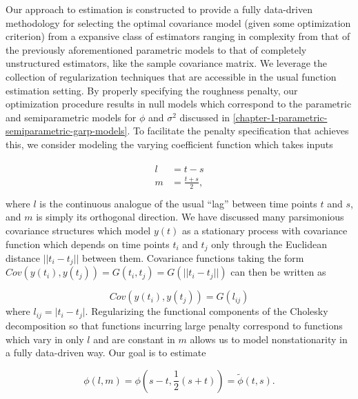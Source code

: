 \documentclass[12pt]{article}
\theoremstyle{definition}
\begin{document}
Our approach to estimation is constructed to provide a fully data-driven methodology for selecting the optimal covariance model (given some optimization criterion) from a expansive class of estimators ranging in complexity from that of the previously aforementioned parametric models to that of completely unstructured estimators, like the sample covariance matrix. We leverage the collection of regularization techniques that are accessible in the usual function estimation setting. By properly specifying the roughness penalty, our optimization procedure results in null models which correspond to the parametric and semiparametric models for $\phi$ and $\sigma^2$ discussed in \ref{chapter-1-parametric-semiparametric-garp-models}. To facilitate the penalty specification that achieves this, we consider modeling the varying coefficient function which takes inputs

\begin{align} 
\begin{split}\label{eq:l-m-transformation}
l &= t - s \\
m &= \frac{t + s}{2}, \\
\end{split}
\end{align}
\noindent
 where $l$ is the continuous analogue of the usual ``lag'' between time points $t$ and $s$, and $m$ is simply its orthogonal direction. We have discussed many parsimonious covariance structures which model $y\left(t\right)$ as a stationary process with covariance function which depends on time points $t_i$ and $t_j$ only through the Euclidean distance $\vert \vert t_i - t_j \vert \vert$ between them. Covariance functions taking the form $Cov\left(y\left( t_i \right),y\left( t_j \right)\right) =G\left(t_i,t_j\right) = G\left(\vert \vert t_i - t_j \vert \vert \right)$ can then be written as 

\begin{equation*}
Cov\left(y\left( t_i \right),y\left( t_j \right)\right) = G\left( l_{ij}  \right)
\end{equation*}
\noindent
where $l_{ij} =  \vert  t_i - t_j  \vert $. Regularizing the functional components of the Cholesky decomposition so that functions incurring large penalty correspond to functions which vary in only $l$ and are constant in $m$ allows us to model nonstationarity in a fully data-driven way.  Our goal is to estimate

\begin{equation} 
\phi\left(l,m\right) = \phi\left(s-t, \frac{1}{2}\left(s+t\right)\right) = \tilde{\phi}\left(t,s\right).
\end{equation}
\end{document}
